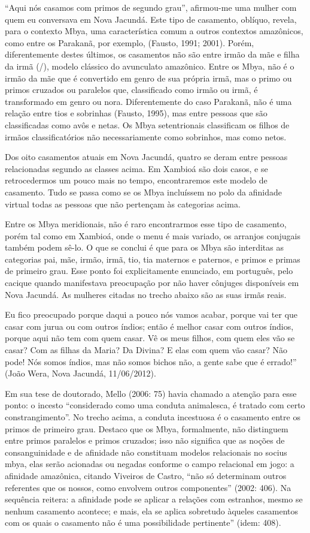 ``Aqui nós casamos com primos de segundo grau'', afirmou-me uma mulher com
quem eu conversava em Nova Jacundá. Este tipo de casamento, oblíquo,
revela, para o contexto Mbya, uma característica comum a outros
contextos amazônicos, como entre os Parakanã, por exemplo, (Fausto,
1991; 2001). Porém, diferentemente destes últimos, os casamentos não
são entre irmão da mãe e filha da irmã (/), modelo clássico do
avunculato amazônico. Entre os Mbya, não é o irmão da mãe que é
convertido em genro de sua própria irmã, mas o primo ou primos cruzados
ou paralelos que, classificado como irmão ou irmã, é transformado em
genro ou nora. Diferentemente do caso Parakanã, não é uma relação entre
tios e sobrinhas (Fausto, 1995), mas entre pessoas que são
classificadas como avôs e netas. Os Mbya setentrionais classificam os
filhos de irmãos classificatórios não necessariamente como sobrinhos,
mas como netos.

Dos oito casamentos atuais em Nova Jacundá, quatro se deram entre
pessoas relacionadas segundo as classes acima. Em Xambioá são dois
casos, e se retrocedermos um pouco mais no tempo, encontraremos este
modelo de casamento. Tudo se passa como se os Mbya incluíssem no polo
da afinidade virtual todas as pessoas que não pertençam às categorias
acima.

Entre os Mbya meridionais, não é raro encontrarmos esse tipo de
casamento, porém tal como em Xambioá, onde o menu é mais variado, os
arranjos conjugais também podem sê-lo. O que se conclui é que para os
Mbya são interditas as categorias pai, mãe, irmão, irmã, tio, tia
maternos e paternos, e primos e primas de primeiro grau. Esse ponto foi
explicitamente enunciado, em português, pelo cacique quando manifestava
preocupação por não haver cônjuges disponíveis em Nova Jacundá. As
mulheres citadas no trecho abaixo são as suas irmãs reais.

Eu fico preocupado porque daqui a pouco nós vamos acabar, porque vai ter
que casar com jurua ou com outros índios; então é melhor casar com
outros índios, porque aqui não tem com quem casar. Vê os meus filhos,
com quem eles vão se casar? Com as filhas da Maria? Da Divina? E elas
com quem vão casar? Não pode! Nós somos índios, mas não somos bichos
não, a gente sabe que é errado!'' (João Wera, Nova Jacundá, 11/06/2012).

Em sua tese de doutorado, Mello (2006: 75) havia chamado a atenção para
esse ponto: o incesto ``considerado como uma conduta animalesca, é
tratado com certo constrangimento''. No trecho acima, a conduta
incestuosa é o casamento entre os primos de primeiro grau. Destaco que
os Mbya, formalmente, não distinguem entre primos paralelos e primos
cruzados; isso não significa que as noções de consanguinidade e de
afinidade não constituam modelos relacionais no socius mbya, elas serão
acionadas ou negadas conforme o campo relacional em jogo: a afinidade
amazônica, citando Viveiros de Castro, ``não só determinam outros
referentes que os nossos, como envolvem outros componentes'' (2002: 406).
Na sequência reitera: a afinidade pode se aplicar a relações com
estranhos, mesmo se nenhum casamento acontece; e mais, ela se aplica
sobretudo àqueles casamentos com os quais o casamento não é uma
possibilidade pertinente'' (idem: 408).

